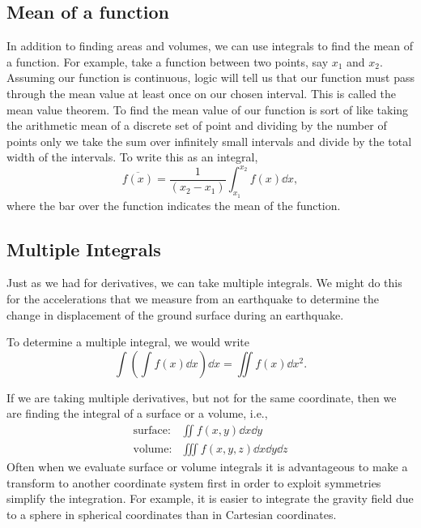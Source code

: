 \documentclass[final,a4paper,12pt]{article}
\theoremstyle{definition}
\begin{document}
\subsection{Mean of a function}
In addition to finding areas and volumes, we can use integrals to find the mean
of a function.  For example, take a function between two points, say $x_1$ and
$x_2$.  Assuming our function is continuous, logic will tell us that our
function must pass through the mean value at least once on our chosen interval.
This is called the mean value theorem.  To find the mean value of our function
is sort of like taking the arithmetic mean of a discrete set of point and
dividing by the number of points only we take the sum over infinitely small
intervals and divide by the total width of the intervals.  To write this as an
integral,
\begin{equation}
    \overline{f(x)} = \frac{1}{(x_2 - x_1)}\int_{x_1}^{x_2} f(x) \dd{x} ,
\end{equation}
where the bar over the function indicates the mean of the function.

\subsection{Multiple Integrals}
Just as we had for derivatives, we can take multiple integrals.  We might do
this for the accelerations that we measure from an earthquake to determine the
change in displacement of the ground surface during an earthquake.

To determine a multiple integral, we would write
\begin{equation*}
    \int \left(\int f(x) \dd{x}\right) \dd{x} = \iint f(x) \dd{x^2} .
\end{equation*}

If we are taking multiple derivatives, but not for the same coordinate, then we are finding the integral of a surface or a volume, i.e.,
\begin{align*}
    \text{surface:} & \iint f(x,y) \dd{x} \dd{y} \\
    \text{volume:} & \iiint f(x,y,z) \dd{x} \dd{y} \dd{z}
\end{align*}
Often when we evaluate surface or volume integrals it is advantageous to make a transform to another coordinate system first in order to exploit symmetries simplify the integration.  For example, it is easier to integrate the gravity field due to a sphere in spherical coordinates than in Cartesian coordinates.
\end{document}
